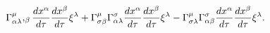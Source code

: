 \begin{equation}
\Gamma _{\alpha \lambda }^{\mu },_{\beta }\frac{dx^{\alpha }}{d\tau }\frac{%
dx^{\beta }}{d\tau }\xi ^{\lambda }+\Gamma _{\sigma \beta }^{\mu }\Gamma
_{\alpha \lambda }^{\sigma }\frac{dx^{\alpha }}{d\tau }\frac{dx^{\beta }}{%
d\tau }\xi ^{\lambda }-\Gamma _{\sigma \lambda }^{\mu }\Gamma _{\alpha \beta
}^{\sigma }\frac{dx^{\alpha }}{d\tau }\frac{dx^{\beta }}{d\tau }\xi
^{\lambda }.  \label{9}
\end{equation}

